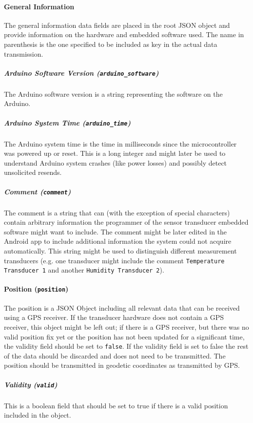 \paragraph{General Information}
The general information data fields are placed in the root JSON object and provide information on the hardware and embedded software used. The name in parenthesis is the one specified to be included as key in the actual data transmission.

\subparagraph{Arduino Software Version (\texttt{arduino\_software})}
The Arduino software version is a string representing the software on the Arduino. 

\subparagraph{Arduino System Time (\texttt{arduino\_time})}
The Arduino system time is the time in milliseconds since the microcontroller was powered up or reset. This is a long integer and might later be used to understand Arduino system crashes (like power losses) and possibly detect unsolicited resends.

\subparagraph{Comment (\texttt{comment})}
The comment is a string that can (with the exception of special characters) contain arbitrary information the programmer of the sensor transducer embedded software might want to include. The comment might be later edited in the Android app to include additional information the system could not acquire automatically.
This string might be used to distinguish different measurement transducers (e.g. one transducer might include the comment \texttt{Temperature Transducer 1} and another \texttt{Humidity Transducer 2}).

\paragraph{Position  (\texttt{position})}
The position is a JSON Object including all relevant data that can be received using a GPS receiver. If the transducer hardware does not contain a GPS receiver, this object might be left out; if there is a GPS receiver, but there was no valid position fix yet or the position has not been updated for a significant time, the validity field should be set to \texttt{false}. If the validity field is set to false the rest of the data should be discarded and does not need to be transmitted. The position should be transmitted in geodetic coordinates as transmitted by GPS.

\subparagraph{Validity (\texttt{valid})}
This is a boolean field that should be set to true if there is a valid position included in the object.

